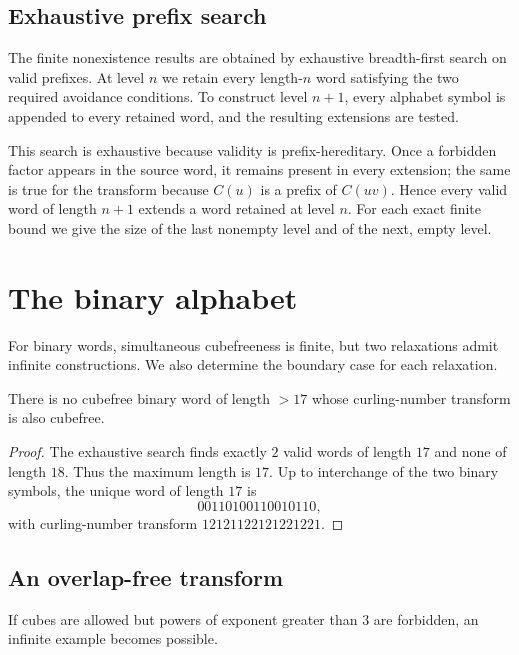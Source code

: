 \documentclass[12pt,reqno]{article}
\begin{document}
\subsection{Exhaustive prefix search}

The finite nonexistence results are obtained by exhaustive breadth-first search on valid prefixes.  At level $n$ we retain every length-$n$ word satisfying the two required avoidance conditions.  To construct level $n+1$, every alphabet symbol is appended to every retained word, and the resulting extensions are tested.

This search is exhaustive because validity is prefix-hereditary.  Once a forbidden factor appears in the source word, it remains present in every extension; the same is true for the transform because $C(u)$ is a prefix of $C(uv)$.  Hence every valid word of length $n+1$ extends a word retained at level $n$.  For each exact finite bound we give the size of the last nonempty level and of the next, empty level.


\section{The binary alphabet}
\label{sec:binary}

For binary words, simultaneous cubefreeness is finite, but two relaxations admit infinite constructions.  We also determine the boundary case for each relaxation.

\begin{theorem} 
\label{thm:binary-cube-cube-max}
There is no cubefree binary word of length $> 17$ whose curling-number transform is 
also cubefree. 
\end{theorem}

\begin{proof} 
The exhaustive search finds exactly $2$ valid words of length $17$ and none of length $18$.  Thus the maximum length is $17$.  Up to interchange of the two binary symbols, the unique word of length $17$ is
$$00110100110010110,$$
with curling-number transform $12121122121221221$.
\end{proof}

\subsection{An overlap-free transform}

If cubes are allowed but powers of exponent greater than $3$ are forbidden, an infinite example becomes possible.
\end{document}
